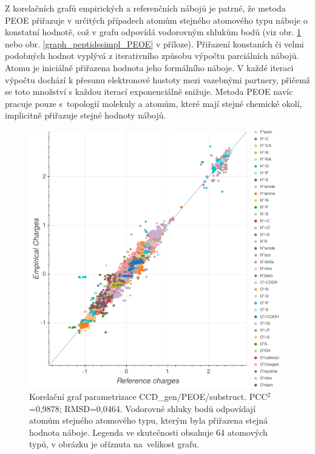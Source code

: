 Z korelačních grafů empirických a referenčních nábojů je patrné, že metoda PEOE přiřazuje v určitých případech atomům stejného atomového typu náboje o konstatní hodnotě, což v grafu odpovídá vodorovným shlukům bodů (viz obr. \ref{graph_corr_PEOE} nebo obr. \ref{graph_peptidesimpl_PEOE} v příloze). Přiřazení konstaních či velmi podobných hodnot vyplývá z iterativního způsobu výpočtu parciálních nábojů. Atomu je iniciálně přiřazena hodnota jeho formálního náboje. V každé iteraci výpočtu dochází k přesunu elektronové hustoty mezi vazebnými partnery, přičemž se toto množství s každou iterací exponenciálně snižuje. Metoda PEOE navíc pracuje pouze s~topologií molekuly a atomům, které mají stejné chemické okolí, implicitně přiřazuje stejné hodnoty nábojů.

\vspace*{0cm}
\begin{figure}[H]
\begin{center}
\includegraphics[width=14cm]{pictures/graph_PEOE_substruct.png}
\caption{Korelační graf parametrizace CCD\_gen/PEOE/substruct.  PCC$^2$=0,9878; RMSD=0,0464. Vodorovné shluky bodů odpovídají atomům stejného atomového typu, kterým byla přiřazena stejná hodnota náboje. Legenda ve skutečnosti obsahuje 64 atomových typů, v obrázku je oříznuta na~velikost grafu.}
\label{graph_corr_PEOE}
\end{center}
\end{figure}

